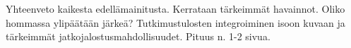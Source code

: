 Yhteenveto kaikesta edellämainitusta. Kerrataan tärkeimmät havainnot. Oliko hommassa ylipäätään järkeä? Tutkimustulosten integroiminen isoon kuvaan ja tärkeimmät jatkojalostusmahdollisuudet. Pituus n. 1-2 sivua.
